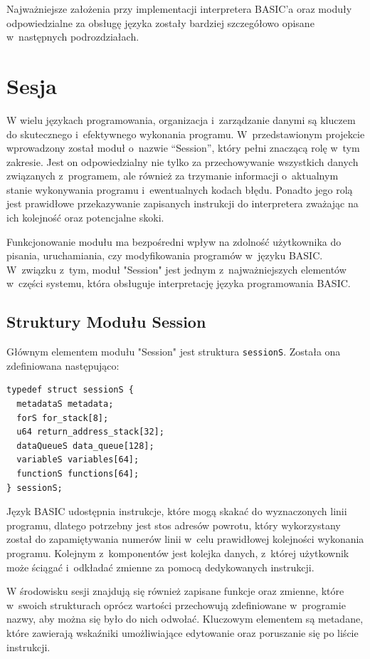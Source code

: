 \documentclass[shortabstract]{iithesis}
\begin{document}
Najważniejsze założenia przy implementacji interpretera BASIC'a oraz moduły odpowiedzialne za obsługę języka zostały bardziej szczegółowo opisane w~następnych podrozdziałach.

\section{Sesja}
W wielu językach programowania, organizacja i~zarządzanie danymi są kluczem do skutecznego i~efektywnego wykonania programu. W~przedstawionym projekcie wprowadzony został moduł o~nazwie “Session”, który pełni znaczącą rolę w~tym zakresie.
Jest on odpowiedzialny nie tylko za przechowywanie wszystkich danych związanych z~programem, ale również za trzymanie informacji o~aktualnym stanie wykonywania programu i~ewentualnych kodach błędu. Ponadto jego rolą jest prawidłowe przekazywanie zapisanych instrukcji do interpretera zważając na ich kolejność oraz potencjalne skoki.

Funkcjonowanie modułu ma bezpośredni wpływ na zdolność użytkownika do pisania, uruchamiania, czy modyfikowania programów w~języku BASIC. W~związku z~tym, moduł "Session" jest jednym z~najważniejszych elementów w~części systemu, która obsługuje interpretację języka programowania BASIC.
\subsection{Struktury Modułu Session}
Głównym elementem modułu "Session" jest struktura \texttt{sessionS}. Została ona zdefiniowana następująco:
\begin{verbatim}
typedef struct sessionS {
  metadataS metadata;
  forS for_stack[8];
  u64 return_address_stack[32];
  dataQueueS data_queue[128];
  variableS variables[64];
  functionS functions[64];
} sessionS;
\end{verbatim}

Język BASIC udostępnia instrukcje, które mogą skakać do wyznaczonych linii programu, dlatego potrzebny jest stos adresów powrotu, który wykorzystany został do zapamiętywania numerów linii w~celu prawidłowej kolejności wykonania programu. Kolejnym z~komponentów jest kolejka danych, z~której użytkownik może ściągać i~odkładać zmienne za pomocą dedykowanych instrukcji.

W środowisku sesji znajdują się również zapisane funkcje oraz zmienne, które w~swoich strukturach oprócz wartości przechowują zdefiniowane w~programie nazwy, aby można się było do nich odwołać. Kluczowym elementem są metadane, które zawierają wskaźniki umożliwiające edytowanie oraz poruszanie się po liście instrukcji.
\end{document}
